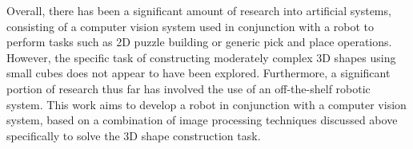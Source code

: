 Overall, there has been a significant amount of research into artificial systems, consisting of a computer vision system used in conjunction with a robot to perform tasks such as 2D puzzle building or generic pick and place operations. However, the specific task of constructing moderately complex 3D shapes using small cubes does not appear to have been explored. Furthermore, a significant portion of research thus far has involved the use of an off-the-shelf robotic system. This work aims to develop a robot in conjunction with a computer vision system, based on a combination of image processing techniques discussed above specifically to solve the 3D shape construction task.


%

\newpage

